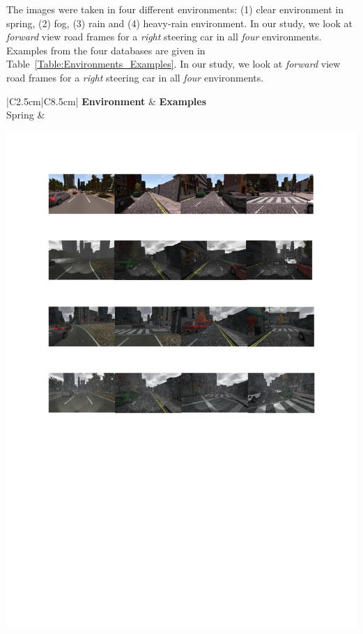 \documentclass{svproc}
\begin{document}
	The images were taken in four different environments: (1) clear environment in spring, (2) fog, (3) rain and (4) heavy-rain environment. In our study, we look at \emph{forward} view road frames for a \emph{right} steering car in all \emph{four} environments. 
	Examples from the four databases are given in Table~\ref{Table:Environments_Examples}.	In our study, we look at \emph{forward} view road frames for a \emph{right} steering car in all \emph{four} environments. 
	
	
	\begin{table}[!ht]
		\centering
		\caption{Examples of the four employed environments}
		\label{Table:Environments_Examples}
		\begin{tabular}{|C{2.5cm}|C{8.5cm}|}
			\hline
			\textbf{Environment} & \textbf{Examples} \\ \hline
			Spring & \begin{minipage}{.9\textwidth}\includegraphics[scale=.5,trim=2cm 24.5cm 2cm 2.5cm,clip]{examples.pdf}\end{minipage} \\ \hline

\end{tabular}
\end{table}
\end{document}
